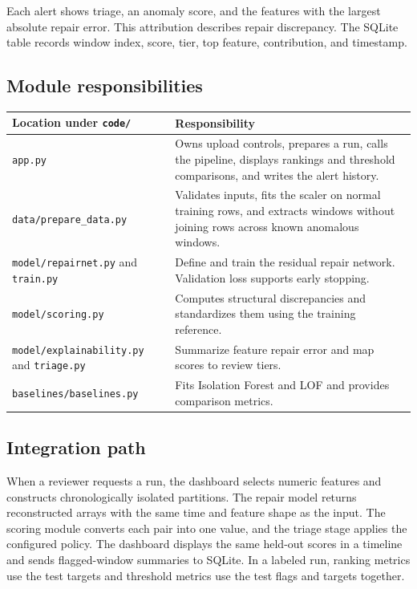 \documentclass[11pt,a4paper]{article}
\begin{document}
Each alert shows triage, an anomaly score, and the features with the largest absolute repair error. This attribution describes repair discrepancy. The SQLite table records window index, score, tier, top feature, contribution, and timestamp.

\subsection{Module responsibilities}
\begin{tabularx}{\linewidth}{@{}lX@{}}
\toprule
Location under \texttt{code/} & Responsibility\\
\midrule
\texttt{app.py} & Owns upload controls, prepares a run, calls the pipeline, displays rankings and threshold comparisons, and writes the alert history.\\
\texttt{data/prepare\_data.py} & Validates inputs, fits the scaler on normal training rows, and extracts windows without joining rows across known anomalous windows.\\
\texttt{model/repairnet.py} and \texttt{train.py} & Define and train the residual repair network. Validation loss supports early stopping.\\
\texttt{model/scoring.py} & Computes structural discrepancies and standardizes them using the training reference.\\
\texttt{model/explainability.py} and \texttt{triage.py} & Summarize feature repair error and map scores to review tiers.\\
\texttt{baselines/baselines.py} & Fits Isolation Forest and LOF and provides comparison metrics.\\
\bottomrule
\end{tabularx}

\subsection{Integration path}
When a reviewer requests a run, the dashboard selects numeric features and constructs chronologically isolated partitions. The repair model returns reconstructed arrays with the same time and feature shape as the input. The scoring module converts each pair into one value, and the triage stage applies the configured policy. The dashboard displays the same held-out scores in a timeline and sends flagged-window summaries to SQLite. In a labeled run, ranking metrics use the test targets and threshold metrics use the test flags and targets together.
\end{document}
